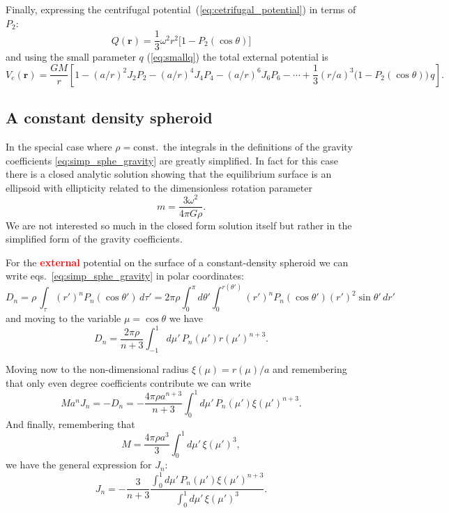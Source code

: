 \documentclass[amsmath,amsfonts,rmp,letterpaper]{revtex4}
\newcommand{\V}[1]{\mathbf{#1}} %
\newcommand{\arr}{\V{r}}
\newcommand{\om}{\omega}
\newcommand{\const}{\mathrm{const.}}
\newcommand{\red}[1]{\textbf{\textcolor{red}{#1}}}
\begin{document}
Finally, expressing the centrifugal potential~(\ref{eq:cetrifugal_potential}) in
terms of $P_2$:
\begin{equation}
Q(\arr) = \frac{1}{3}\omega^2r^2\bigl[1 - P_2(\cos\theta)\bigr]
\end{equation}
and using the small parameter $q$ (\ref{eq:smallq}) the total external potential
is
\begin{equation}\label{eq:total_external_potential}
V_e(\arr) = \frac{GM}{r}\left[1 - (a/r)^2J_2P_2 - (a/r)^4J_4P_4 -
(a/r)^6J_6P_6 - \cdots + \frac{1}{3}(r/a)^3\bigl(1 - 
P_2(\cos\theta)\bigr)\,q\right].
\end{equation}


\subsection{A constant density spheroid} %
\label{sec:a_constant_density_spheroid}
In the special case where $\rho=\const$~the integrals in the definitions of the
gravity coefficients \eqref{eq:simp_sphe_gravity} are greatly simplified. In fact
for this case there is a closed analytic solution showing that the equilibrium
surface is an ellipsoid with ellipticity related to the dimensionless rotation
parameter
\begin{equation}
m = \frac{3\om^2}{4\pi{G}\rho}.
\end{equation}
We are not interested so much in the closed form solution itself but rather in
the simplified form of the gravity coefficients.

For the \red{external} potential on the surface of a constant-density spheroid we
can write eqs.~\eqref{eq:simp_sphe_gravity} in polar coordinates:
\begin{equation}\label{eq:polar_integral}
D_n = \rho\,\int_\tau (r')^nP_n(\cos\theta')\,d\tau' =
2\pi\rho\int_{0}^{\pi}d\theta'\int_{0}^{r(\theta')}(r')^nP_n(\cos\theta')
(r')^2\sin\theta'\,dr'
\end{equation}
and moving to the variable $\mu=\cos\theta$ we have
\begin{equation}
D_n = \frac{2\pi\rho}{n + 3}\int_{-1}^{1}d\mu'\,P_n(\mu')r(\mu')^{n + 3}.
\end{equation}

Moving now to the non-dimensional radius $\xi(\mu) = r(\mu)/a$ and remembering
that only even degree coefficients contribute we can write
\begin{equation}
Ma^nJ_n = -D_n =
-\frac{4\pi\rho{}a^{n + 3}}{n + 3}\int_{0}^{1}d\mu'\,P_n(\mu')\xi(\mu')^{n + 3}.
\end{equation}
And finally, remembering that
\begin{equation}
M = \frac{4\pi\rho{}a^3}{3}\int_{0}^{1}d\mu'\,\xi(\mu')^3,
\end{equation}
we have the general expression for $J_n$:
\begin{equation}\label{eq:Jn_maclaurin_ext}
J_n = -\frac{3}{n + 3}\frac{\int_{0}^{1}d\mu'\,P_n(\mu')\xi(\mu')^{n+3}}{\int_{0}^
{1}d\mu'\,\xi(\mu')^3}.
\end{equation}
\end{document}
